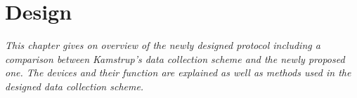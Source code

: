 \chapter{Design}
\label{sec:design}

\textit{This chapter gives on overview of the newly designed protocol including a comparison between Kamstrup's data collection scheme and the newly proposed one. The devices and their function are explained as well as methods used in the designed data collection scheme.}






